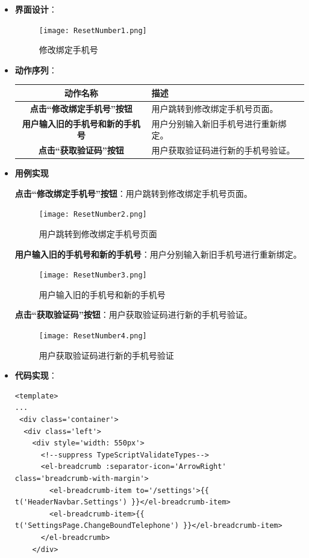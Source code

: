 \begin{itemize}
\item \textbf{界面设计}：
	\begin{figure}[H]
		\centering
		\texttt{[image: ResetNumber1.png]}
		\caption{修改绑定手机号}
	\end{figure}
	\item \textbf{动作序列}：
	\begin{table}[H]
		\centering
		\renewcommand\arraystretch{1.5}
		\begin{tabular}{|c|>{\raggedright\arraybackslash}p{10cm}|}
			\hline
			\textbf{动作名称} & \textbf{描述} \\ \hline
			\textbf{点击“修改绑定手机号”按钮} & 用户跳转到修改绑定手机号页面。\\ \hline
			\textbf{用户输入旧的手机号和新的手机号} & 用户分别输入新旧手机号进行重新绑定。\\ \hline
			\textbf{点击“获取验证码”按钮} & 用户获取验证码进行新的手机号验证。\\ \hline
		\end{tabular}
	\end{table}

	\item \textbf{用例实现}

	\textbf{点击“修改绑定手机号”按钮}：用户跳转到修改绑定手机号页面。

	\begin{figure}[H]
		\centering
		\texttt{[image: ResetNumber2.png]}
		\caption{用户跳转到修改绑定手机号页面}
	\end{figure}

	\textbf{用户输入旧的手机号和新的手机号}：用户分别输入新旧手机号进行重新绑定。

	\begin{figure}[H]
		\centering
		\texttt{[image: ResetNumber3.png]}
		\caption{用户输入旧的手机号和新的手机号}
	\end{figure}

	\textbf{点击“获取验证码”按钮}：用户获取验证码进行新的手机号验证。

	\begin{figure}[H]
		\centering
		\texttt{[image: ResetNumber4.png]}
		\caption{用户获取验证码进行新的手机号验证}
	\end{figure}

	\item \textbf{代码实现}：
	\begin{verbatim}
<template>
...
 <div class='container'>
  <div class='left'>
    <div style='width: 550px'>
      <!--suppress TypeScriptValidateTypes-->
      <el-breadcrumb :separator-icon='ArrowRight' class='breadcrumb-with-margin'>
        <el-breadcrumb-item to='/settings'>{{ t('HeaderNavbar.Settings') }}</el-breadcrumb-item>
        <el-breadcrumb-item>{{ t('SettingsPage.ChangeBoundTelephone') }}</el-breadcrumb-item>
      </el-breadcrumb>
    </div>
	

\end{verbatim}
\end{itemize}
